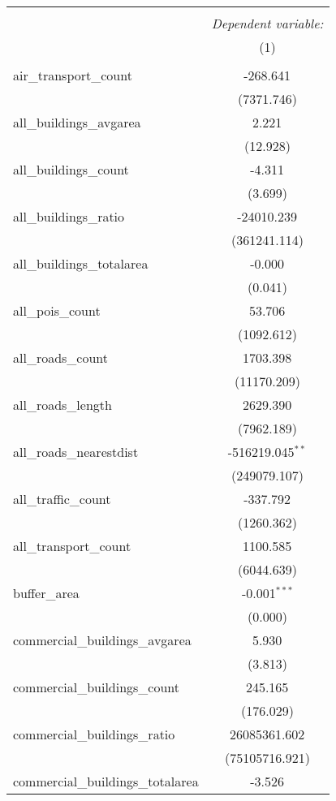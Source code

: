 \begin{table}[!htbp] \centering
\begin{tabular}{@{\extracolsep{5pt}}lc}
\\[-1.8ex]\hline
\hline \\[-1.8ex]
& \multicolumn{1}{c}{\textit{Dependent variable:}} \
\cr \cline{1-2}
\\[-1.8ex] & (1) \\
\hline \\[-1.8ex]
 air_transport_count & -268.641$^{}$ \\
  & (7371.746) \\
 all_buildings_avgarea & 2.221$^{}$ \\
  & (12.928) \\
 all_buildings_count & -4.311$^{}$ \\
  & (3.699) \\
 all_buildings_ratio & -24010.239$^{}$ \\
  & (361241.114) \\
 all_buildings_totalarea & -0.000$^{}$ \\
  & (0.041) \\
 all_pois_count & 53.706$^{}$ \\
  & (1092.612) \\
 all_roads_count & 1703.398$^{}$ \\
  & (11170.209) \\
 all_roads_length & 2629.390$^{}$ \\
  & (7962.189) \\
 all_roads_nearestdist & -516219.045$^{**}$ \\
  & (249079.107) \\
 all_traffic_count & -337.792$^{}$ \\
  & (1260.362) \\
 all_transport_count & 1100.585$^{}$ \\
  & (6044.639) \\
 buffer_area & -0.001$^{***}$ \\
  & (0.000) \\
 commercial_buildings_avgarea & 5.930$^{}$ \\
  & (3.813) \\
 commercial_buildings_count & 245.165$^{}$ \\
  & (176.029) \\
 commercial_buildings_ratio & 26085361.602$^{}$ \\
  & (75105716.921) \\
 commercial_buildings_totalarea & -3.526$^{}$ \\

\end{tabular}
\end{table}
